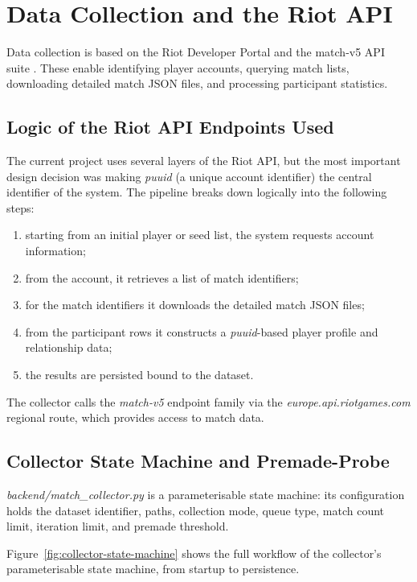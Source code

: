 \chapter{Data Collection and the Riot API}

Data collection is based on the Riot Developer Portal and the match-v5 API suite \cite{riotportal,riotapi}. These enable identifying player accounts, querying match lists, downloading detailed match JSON files, and processing participant statistics.

\section{Logic of the Riot API Endpoints Used}

The current project uses several layers of the Riot API, but the most important design decision was making \textit{puuid} (a unique account identifier) the central identifier of the system. The pipeline breaks down logically into the following steps:

\begin{enumerate}
    \item starting from an initial player or seed list, the system requests account information;
    \item from the account, it retrieves a list of match identifiers;
    \item for the match identifiers it downloads the detailed match JSON files;
    \item from the participant rows it constructs a \textit{puuid}-based player profile and relationship data;
    \item the results are persisted bound to the dataset.
\end{enumerate}

The collector calls the \textit{match-v5} endpoint family via the \textit{europe.api.riotgames.com} regional route, which provides access to match data.

\section{Collector State Machine and Premade-Probe}

\textit{backend/match\_collector.py} is a parameterisable state machine: its configuration holds the dataset identifier, paths, collection mode, queue type, match count limit, iteration limit, and premade threshold.

Figure~\ref{fig:collector-state-machine} shows the full workflow of the collector's parameterisable state machine, from startup to persistence.


